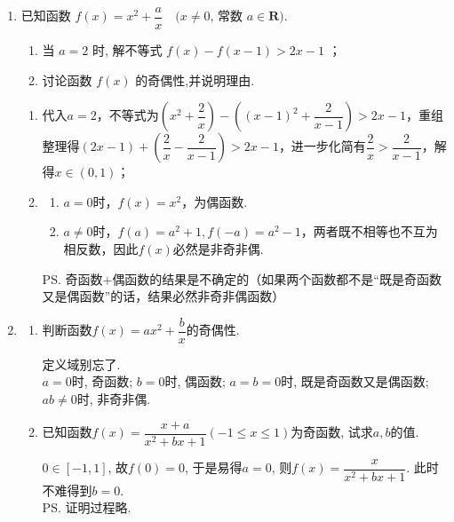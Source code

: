 \begin{enumerate}
\item 已知函数 $f(x)=x^2+\dfrac{a}{x} \quad(x \neq 0$, 常数 $a \in \mathbf{R})$.
\begin{enumerate}
    \item 当 $a=2$ 时, 解不等式 $f(x)-f(x-1)>2 x-1$ ；
    \item 讨论函数 $f(x)$ 的奇偶性,并说明理由.
\end{enumerate}
\begin{jieda}
    \begin{enumerate}
        \item 代入$a = 2$，不等式为$(x^2 + \dfrac{2}{x}) - ((x-1)^2 + \dfrac{2}{x-1}) > 2x-1$，重组整理得$(2x-1) + (\dfrac{2}{x} - \dfrac{2}{x-1}) > 2x-1$，进一步化简有$\dfrac{2}{x} > \dfrac{2}{x-1}$，解得$x \in (0,1)$；
        \item \begin{enumerate}
            \item $a = 0$时，$f(x) = x^2$，为偶函数.
            \item $a \neq 0$时，$f(a) = a^2+1, f(-a) = a^2-1$，两者既不相等也不互为相反数，因此$f(x)$必然是非奇非偶. 
        \end{enumerate}
        \ps 奇函数$+$偶函数的结果是不确定的（如果两个函数都不是“既是奇函数又是偶函数”的话，结果必然非奇非偶函数）
    \end{enumerate}
\end{jieda}
\begin{vspace_}
   \vsp[4] 
\end{vspace_}


\item 
\begin{enumerate}

\item 判断函数$f(x)=ax^2+\dfrac{b}{x}$的奇偶性. 
\begin{jieda}
定义域别忘了. \\
$a=0$时, 奇函数; $b=0$时, 偶函数; $a=b=0$时, 既是奇函数又是偶函数; $ab\neq 0$时, 非奇非偶. 
\end{jieda}


\item 已知函数$f(x)=\dfrac{x+a}{x^2+bx+1}(-1\leq x\leq 1)$为奇函数, 试求$a,b$的值. 
\begin{jieda}
$0\in[-1,1]$, 故$f(0)=0$, 于是易得$a=0$, 则$f(x)=\dfrac{x}{x^2+bx+1}$. 此时不难得到$b=0$. \\
\ps 证明过程略. 
\end{jieda}



\end{enumerate}
\end{enumerate}
